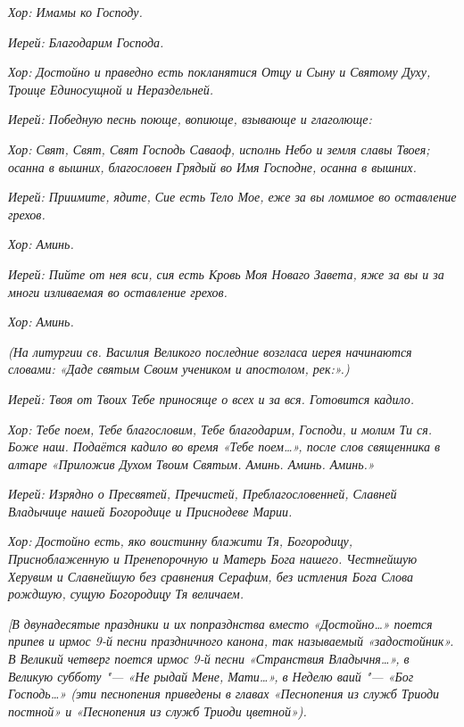 \itshape Хор:\normalfont{} Имамы ко Господу.


 \itshape Иерей:\normalfont{} Благодарим Господа.


 \itshape Хор:\normalfont{} Достойно и праведно есть покланятися Отцу и Сыну и Святому
Духу, Троице Единосущной и Нераздельней.


 \itshape Иерей:\normalfont{} Победную песнь поюще, вопиюще, взывающе и глаголюще:


 \itshape Хор:\normalfont{} Свят, Свят, Свят Господь Саваоф, исполнь Небо и земля славы
Твоея; осанна в вышних, благословен Грядый во Имя Господне, осанна в
вышних.


 \itshape Иерей:\normalfont{} Приимите, ядите, Сие есть Тело Мое, еже за вы ломимое во
оставление грехов.


 \itshape Хор:\normalfont{} Аминь.


 \itshape Иерей:\normalfont{} Пийте от нея вси, сия есть Кровь Моя Новаго Завета, яже за вы и
за многи изливаемая во оставление грехов.


 \itshape Хор:\normalfont{} Аминь.


 \itshape (На литургии св. Василия Великого последние возгласа иерея
начинаются словами: «Даде святым Своим учеником и апостолом,
рек:».)\normalfont{}


 \itshape Иерей:\normalfont{} Твоя от Твоих Тебе приносяще о всех и за вся. \itshape Готовится
кадило\normalfont{}.


 \itshape Хор:\normalfont{} Тебе поем, Тебе благословим, Тебе благодарим, Господи, и молим
Ти ся. Боже наш. \itshape Подаётся кадило во время «Тебе поем…», после слов
священника в алтаре «Приложив Духом Твоим Святым. Аминь. Аминь.
Аминь.»\normalfont{}


 \itshape Иерей:\normalfont{} Изрядно о Пресвятей, Пречистей, Преблагословенней, Славней
Владычице нашей Богородице и Приснодеве Марии.


 \itshape Хор:\normalfont{} Достойно есть, яко воистинну блажити Тя, Богородицу,
Присноблаженную и Пренепорочную и Матерь Бога нашего. Честнейшую
Херувим и Славнейшую без сравнения Серафим, без истления Бога Слова
рождшую, сущую Богородицу Тя величаем.


 \itshape [В двунадесятые праздники и их попразднства вместо «Достойно…»
поется припев и ирмос 9-й песни праздничного канона, так называемый
«задостойник». В Великий четверг поется ирмос 9-й песни «Странствия
Владычня…», в Великую субботу "--- «Не рыдай Мене, Мати…», в Неделю
ваий "--- «Бог Господь…» (эти песнопения приведены в главах «Песнопения из
служб Триоди постной» и «Песнопения из служб Триоди цветной»).\normalfont{}


